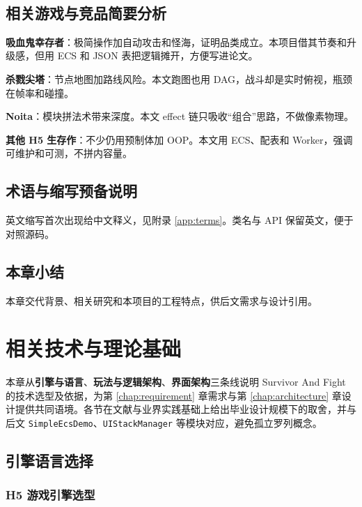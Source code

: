 \documentclass[UTF8,a4paper]{ctexart}
\begin{document}
﻿
\section{相关游戏与竞品简要分析}

\textbf{吸血鬼幸存者}：极简操作加自动攻击和怪海，证明品类成立\cite{gregory2018game}。本项目借其节奏和升级感，但用 ECS 和 JSON 表把逻辑摊开，方便写进论文。

\textbf{杀戮尖塔}：节点地图加路线风险\cite{gregory2018game}。本文跑图也用 DAG，战斗却是实时俯视，瓶颈在帧率和碰撞。

\textbf{Noita}：模块拼法术带来深度\cite{gregory2018game}。本文 effect 链只吸收“组合”思路，不做像素物理。

\textbf{其他 H5 生存作}：不少仍用预制体加 OOP。本文用 ECS、配表和 Worker，强调可维护和可测，不拼内容量。

\section{术语与缩写预备说明}

英文缩写首次出现给中文释义，见附录 \ref{app:terms}。类名与 API 保留英文，便于对照源码。


\section{本章小结}

本章交代背景、相关研究和本项目的工程特点，供后文需求与设计引用。

\chapter{相关技术与理论基础}
\label{chap:related}

本章从\textbf{引擎与语言}、\textbf{玩法与逻辑架构}、\textbf{界面架构}三条线说明 Survivor And Fight 的技术选型及依据，为第 \ref{chap:requirement} 章需求与第 \ref{chap:architecture} 章设计提供共同语境。各节在文献与业界实践基础上给出毕业设计规模下的取舍，并与后文 \texttt{SimpleEcsDemo}、\texttt{UIStackManager} 等模块对应，避免孤立罗列概念。

\section{引擎语言选择}
\label{sec:engine-lang}

\subsection{H5 游戏引擎选型}
\end{document}
